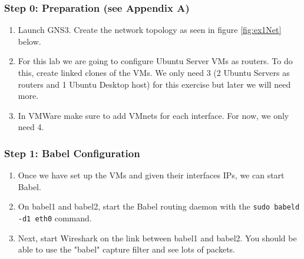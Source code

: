\documentclass[main.tex]{subfiles}
\begin{document}
\subsubsection{Step 0: Preparation (see Appendix A)}
\begin{enumerate}[noitemsep,label=$\bullet$,leftmargin=20mm,labelsep=0.5cm]

\item Launch GNS3. Create the network topology as seen in figure \ref{fig:ex1Net} below.


\item For this lab we are going to configure Ubuntu Server VMs as routers. To do this, create linked clones of the VMs. We only need 3 (2 Ubuntu Servers as routers and 1 Ubuntu Desktop host) for this exercise but later we will need more.

\item In VMWare make sure to add VMnets for each interface. For now, we only need 4.

\end{enumerate}

\subsubsection{Step 1: Babel Configuration} 
\begin{enumerate}[noitemsep,label=$\bullet$,leftmargin=20mm,labelsep=0.5cm]

\item Once we have set up the VMs and given their interfaces IPs, we can start Babel.

\item On babel1 and babel2, start the Babel routing daemon with the \texttt{sudo babeld -d1 eth0} command.


\item Next, start Wireshark on the link between babel1 and babel2. You should be able to use the "babel" capture filter and see lots of packets.


\end{enumerate}
\end{document}
